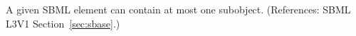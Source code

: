 A given SBML element can contain at most one \Annotation subobject.
(References: SBML L3V1 Section~\ref{sec:sbase}.)

